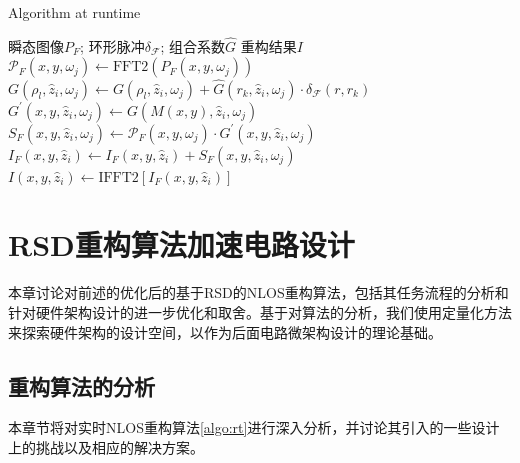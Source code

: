 \documentclass[master]{shtthesis}             %
\begin{document}
\begin{algorithm*}[!t]
    \caption{Algorithm at runtime}
    \label{algo:rt}
    \begin{algorithmic}[1]
        \Require 瞬态图像$P_F$; 环形脉冲$\delta_{\mathcal{F}}$; 组合系数$\hat{G}$
        \Ensure 重构结果$I$
                \State $\mathcal{P}_F(x, y, \omega_j) \gets \text{FFT2}(P_F(x, y, \omega_j))$
                        \State $G(\rho_l, \hat{z}_i, \omega_j) \gets G(\rho_l, \hat{z}_i, \omega_j) + \hat{G}(r_k, \hat{z}_i, \omega_j)\cdot \delta_{\mathcal{F}}(r, r_k) $
                    \EndFor
                \EndFor
                 
                        \State $G^{\prime}(x, y, \hat{z}_i, \omega_j) \gets G(M(x, y), \hat{z}_i, \omega_j)$ 
                        \State $ S_F(x, y, \hat{z}_i, \omega_j) \gets \mathcal{P}_F(x, y, \omega_j) \cdot G^{\prime}(x, y, \hat{z}_i, \omega_j) $ 
                    \EndFor
                \EndFor
                \State $I_F(x, y, \hat{z}_i) \gets I_F(x, y, \hat{z}_i) + S_F(x, y, \hat{z}_i, \omega_j)$ 
            \EndFor
            \State $I(x, y, \hat{z}_i) \gets \text{IFFT2} \left[ I_F(x, y, \hat{z}_i) \right]$ \EndFor 
        \EndProcedure
    \end{algorithmic}
\end{algorithm*}

\chapter{RSD重构算法加速电路设计}
本章讨论对前述的优化后的基于RSD的NLOS重构算法，包括其任务流程的分析和针对硬件架构设计的进一步优化和取舍。基于对算法的分析，我们使用定量化方法来探索硬件架构的设计空间，以作为后面电路微架构设计的理论基础。

\section{重构算法的分析} 
本章节将对实时NLOS重构算法\ref{algo:rt}进行深入分析，并讨论其引入的一些设计上的挑战以及相应的解决方案。
\end{document}
